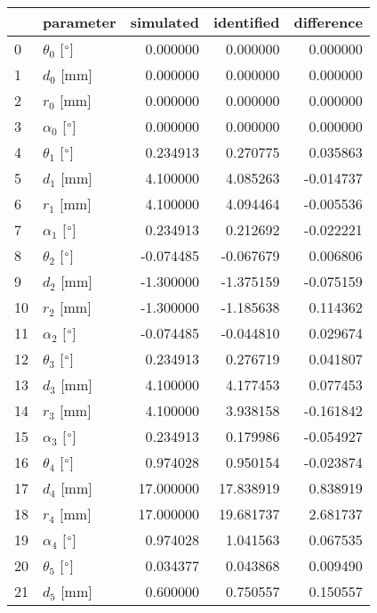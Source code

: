 \documentclass{standalone}%
\begin{document}
%
\normalsize%
\begin{tabular}{llrrr}
\toprule
{} &                 parameter &  simulated & identified & difference \\
\midrule
0  &  $\theta_{0}$ [$\degree$] &   0.000000 &   0.000000 &   0.000000 \\
1  &              $d_{0}$ [mm] &   0.000000 &   0.000000 &   0.000000 \\
2  &              $r_{0}$ [mm] &   0.000000 &   0.000000 &   0.000000 \\
3  &  $\alpha_{0}$ [$\degree$] &   0.000000 &   0.000000 &   0.000000 \\
4  &  $\theta_{1}$ [$\degree$] &   0.234913 &   0.270775 &   0.035863 \\
5  &              $d_{1}$ [mm] &   4.100000 &   4.085263 &  -0.014737 \\
6  &              $r_{1}$ [mm] &   4.100000 &   4.094464 &  -0.005536 \\
7  &  $\alpha_{1}$ [$\degree$] &   0.234913 &   0.212692 &  -0.022221 \\
8  &  $\theta_{2}$ [$\degree$] &  -0.074485 &  -0.067679 &   0.006806 \\
9  &              $d_{2}$ [mm] &  -1.300000 &  -1.375159 &  -0.075159 \\
10 &              $r_{2}$ [mm] &  -1.300000 &  -1.185638 &   0.114362 \\
11 &  $\alpha_{2}$ [$\degree$] &  -0.074485 &  -0.044810 &   0.029674 \\
12 &  $\theta_{3}$ [$\degree$] &   0.234913 &   0.276719 &   0.041807 \\
13 &              $d_{3}$ [mm] &   4.100000 &   4.177453 &   0.077453 \\
14 &              $r_{3}$ [mm] &   4.100000 &   3.938158 &  -0.161842 \\
15 &  $\alpha_{3}$ [$\degree$] &   0.234913 &   0.179986 &  -0.054927 \\
16 &  $\theta_{4}$ [$\degree$] &   0.974028 &   0.950154 &  -0.023874 \\
17 &              $d_{4}$ [mm] &  17.000000 &  17.838919 &   0.838919 \\
18 &              $r_{4}$ [mm] &  17.000000 &  19.681737 &   2.681737 \\
19 &  $\alpha_{4}$ [$\degree$] &   0.974028 &   1.041563 &   0.067535 \\
20 &  $\theta_{5}$ [$\degree$] &   0.034377 &   0.043868 &   0.009490 \\
21 &              $d_{5}$ [mm] &   0.600000 &   0.750557 &   0.150557 \\

\end{tabular}
\end{document}
